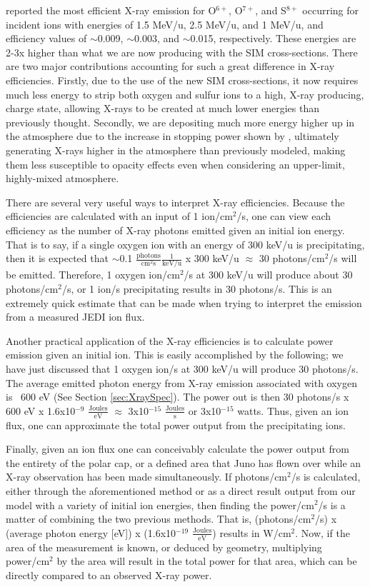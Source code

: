 \documentclass[draft]{agujournal2018}
\begin{document}
\citet{ozak2010} reported the most efficient X-ray emission for O$^{6+}$, O$^{7+}$, and S$^{8+}$ occurring for incident ions with energies of 1.5 MeV/u, 2.5 MeV/u, and 1 MeV/u, and efficiency values of $\sim$0.009, $\sim$0.003, and $\sim$0.015, respectively.
These energies are 2-3x higher than what we are now producing with the SIM cross-sections.
There are two major contributions accounting for such a great difference in X-ray efficiencies.
Firstly, due to the use of the new SIM cross-sections, it now requires much less energy to strip both oxygen and sulfur ions to a high, X-ray producing, charge state, allowing X-rays to be created at much lower energies than previously thought.
Secondly, we are depositing much more energy higher up in the atmosphere due to the increase in stopping power shown by \citet{schultz2019}, ultimately generating X-rays higher in the atmosphere than previously modeled, making them less susceptible to opacity effects even when considering an upper-limit, highly-mixed atmosphere.

There are several very useful ways to interpret X-ray efficiencies.
Because the efficiencies are calculated with an input of 1 ion/cm$^2$/s, one can view each efficiency as the number of X-ray photons emitted given an initial ion energy.
That is to say, if a single oxygen ion with an energy of 300 keV/u is precipitating, then it is expected that $\sim$0.1 $\frac{\mathrm{photons}}{\mathrm{cm}^2 \mathrm{s}}\frac{1}{\mathrm{keV/u}}$ x 300 keV/u $\approx$ 30 photons/cm$^2$/s will be emitted.
Therefore, 1 oxygen ion/cm$^2$/s at 300 keV/u will produce about 30 photons/cm$^2$/s, or 1 ion/s precipitating results in 30 photons/s.
This is an extremely quick estimate that can be made when trying to interpret the emission from a measured JEDI ion flux.

Another practical application of the X-ray efficiencies is to calculate power emission given an initial ion.
This is easily accomplished by the following; we have just discussed that 1 oxygen ion/s at 300 keV/u will produce 30 photons/s.
The average emitted photon energy from X-ray emission associated with oxygen is ~600 eV (See Section \ref{sec:XraySpec}).
The power out is then 30 photons/s x 600 eV x 1.6x10$^{-9}$ $\frac{\mathrm{Joules}}{\mathrm{eV}}$ $\approx$ 3x10$^{-15}$ $\frac{\mathrm{Joules}}{\mathrm{s}}$ or 3x10$^{-15}$ watts.
Thus, given an ion flux, one can approximate the total power output from the precipitating ions.

Finally, given an ion flux one can conceivably calculate the power output from the entirety of the polar cap, or a defined area that Juno has flown over while an X-ray observation has been made simultaneously.
If photons/cm$^2$/s is calculated, either through the aforementioned method or as a direct result output from our model with a variety of initial ion energies, then finding the power/cm$^2$/s is a matter of combining the two  previous methods.
That is, (photons/cm$^2$/s) x (average photon energy [eV]) x (1.6x10$^{-19}$ $\frac{\mathrm{Joules}}{\mathrm{eV}}$) results in W/cm$^2$.
Now, if the area of the measurement is known, or deduced by geometry, multiplying power/cm$^2$ by the area will result in the total power for that area, which can be directly compared to an observed X-ray power.
\end{document}
